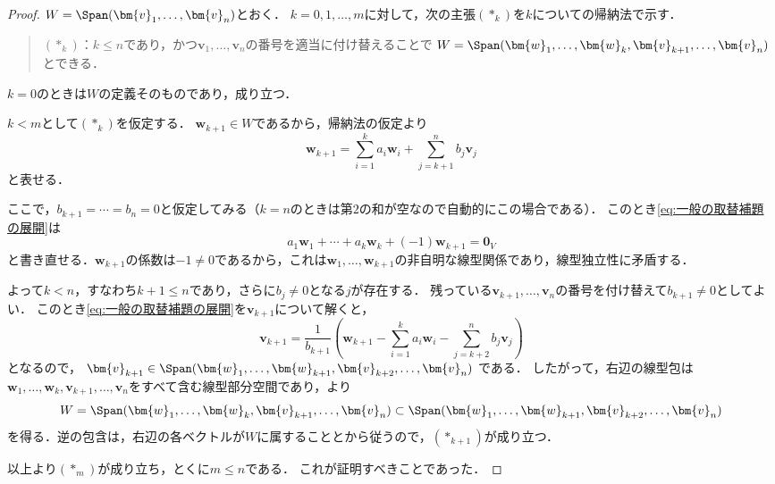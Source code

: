\begin{tleftbar}
\begin{proof}
  $W = \Span(\bm{v}_1, \dots, \bm{v}_n)$とおく．
  $k = 0, 1, \dots, m$に対して，次の主張$(\ast_k)$を$k$についての帰納法で示す．

  \begin{quote}
    $(\ast_k)$：$k \le n$であり，かつ$\bm{v}_1, \dots, \bm{v}_n$の番号を適当に付け替えることで
    $W = \Span(\bm{w}_1, \dots, \bm{w}_k, \bm{v}_{k+1}, \dots, \bm{v}_n)$
    とできる．
  \end{quote}

  $k = 0$のときは$W$の定義そのものであり，成り立つ．

  $k < m$として$(\ast_k)$を仮定する．
  $\bm{w}_{k+1} \in W$であるから，帰納法の仮定より
  \begin{equation}
    \bm{w}_{k+1}
    = \sum_{i=1}^{k} a_i \bm{w}_i + \sum_{j=k+1}^{n} b_j \bm{v}_j
    \label{eq:一般の取替補題の展開}
  \end{equation}
  と表せる．

  ここで，$b_{k+1} = \cdots = b_n = 0$と仮定してみる（$k = n$のときは第$2$の和が空なので自動的にこの場合である）．
  このとき\eqref{eq:一般の取替補題の展開}は
  \[
    a_1 \bm{w}_1 + \cdots + a_k \bm{w}_k + (-1)\bm{w}_{k+1} = \bm{0}_V
  \]
  と書き直せる．$\bm{w}_{k+1}$の係数は$-1 \ne 0$であるから，これは$\bm{w}_1, \dots, \bm{w}_{k+1}$の非自明な線型関係であり，線型独立性に矛盾する．

  よって$k < n$，すなわち$k + 1 \le n$であり，さらに$b_j \ne 0$となる$j$が存在する．
  残っている$\bm{v}_{k+1}, \dots, \bm{v}_n$の番号を付け替えて$b_{k+1} \ne 0$としてよい．
  このとき\eqref{eq:一般の取替補題の展開}を$\bm{v}_{k+1}$について解くと，
  \[
    \bm{v}_{k+1}
    = \frac{1}{b_{k+1}}\left( \bm{w}_{k+1} - \sum_{i=1}^{k} a_i \bm{w}_i - \sum_{j=k+2}^{n} b_j \bm{v}_j \right)
  \]
  となるので，
  $\bm{v}_{k+1} \in \Span(\bm{w}_1, \dots, \bm{w}_{k+1}, \bm{v}_{k+2}, \dots, \bm{v}_n)$
  である．
  したがって，右辺の線型包は$\bm{w}_1, \dots, \bm{w}_k, \bm{v}_{k+1}, \dots, \bm{v}_n$をすべて含む線型部分空間であり，より
  \[
    W = \Span(\bm{w}_1, \dots, \bm{w}_k, \bm{v}_{k+1}, \dots, \bm{v}_n)
    \subset \Span(\bm{w}_1, \dots, \bm{w}_{k+1}, \bm{v}_{k+2}, \dots, \bm{v}_n)
  \]
  を得る．逆の包含は，右辺の各ベクトルが$W$に属することとから従うので，$(\ast_{k+1})$が成り立つ．

  以上より$(\ast_m)$が成り立ち，とくに$m \le n$である．
  これが証明すべきことであった．
\end{proof}
\end{tleftbar}


